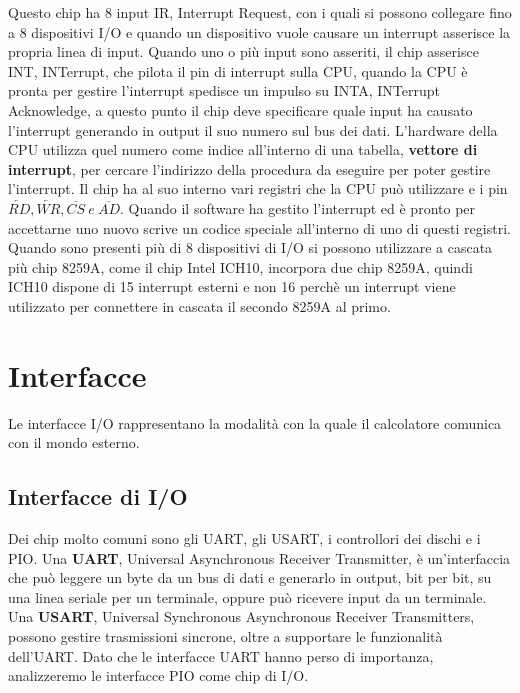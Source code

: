 \documentclass[12pt]{report}
\begin{document}
			 Questo chip ha 8 input IR, Interrupt Request, con i quali si possono collegare fino a 8 dispositivi I/O e quando un dispositivo vuole causare un interrupt asserisce la propria linea di input. Quando uno o più input sono asseriti, il chip asserisce INT, INTerrupt, che pilota il pin di interrupt sulla CPU, quando la CPU è pronta per  gestire l'interrupt spedisce un impulso su INTA, INTerrupt Acknowledge, a questo punto il chip deve specificare quale input ha causato l'interrupt generando in output il suo numero sul bus dei dati. L'hardware della CPU utilizza quel numero come indice all'interno di una tabella, \textbf{vettore di interrupt}, per cercare l'indirizzo della procedura da eseguire per poter gestire l'interrupt.
			 Il chip ha al suo interno vari registri che la CPU può utilizzare e i pin $\overleftarrow{RD}, \overleftarrow{WR}, \overline{CS}\ e \ \overline{AD}$. Quando il software ha gestito l'interrupt ed è pronto per accettarne uno nuovo scrive un codice speciale all'interno di uno di questi registri. \\
			 Quando sono presenti più di 8 dispositivi di I/O si possono utilizzare a cascata più chip 8259A, come il chip Intel ICH10, incorpora due chip 8259A, quindi ICH10 dispone di 15 interrupt esterni e non 16 perchè un interrupt viene utilizzato per connettere in cascata il secondo 8259A al primo.
			 \section{Interfacce}
			 Le interfacce I/O rappresentano la modalità con la quale il calcolatore comunica con il mondo esterno.
			 \subsection{Interfacce di I/O}
			 Dei chip molto comuni sono gli UART, gli USART, i controllori dei dischi e i PIO. Una \textbf{UART}, Universal Asynchronous Receiver Transmitter, è un'interfaccia che può leggere un byte da un bus di dati e generarlo in output, bit per bit, su una linea seriale per un terminale, oppure può ricevere input da un terminale. Una \textbf{USART}, Universal Synchronous Asynchronous Receiver Transmitters, possono gestire trasmissioni sincrone, oltre a supportare le funzionalità dell'UART. Dato che le interfacce UART hanno perso di importanza, analizzeremo le interfacce PIO come chip di I/O.
\end{document}
